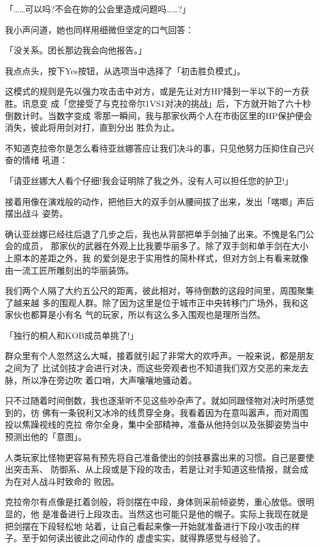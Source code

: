 \documentclass[11pt]{book}
\begin{document}
「……可以吗?不会在妳的公会里造成问题吗……?」

我小声问道，她也同样用细微但坚定的口气回答：

「没关系。团长那边我会向他报告。」

我点点头，按下Yes按钮，从选项当中选择了「初击胜负模式」。

这模式的规则是先以强力攻击击中对方，或是先让对方HP降到一半以下的一方获胜。讯息变
成「您接受了与克拉帝尔1VS1对决的挑战」后，下方就开始了六十秒倒数计时。当数字变成
零那一瞬间，我与那家伙两个人在市街区里的HP保护便会消失，彼此将用剑对打，直到分出
胜负为止。

不知道克拉帝尔是怎么看待亚丝娜答应让我们决斗的事，只见他努力压抑住自己兴奋的情绪
吼道：

「请亚丝娜大人看个仔细!我会证明除了我之外，没有人可以担任您的护卫!」

接着用像在演戏般的动作，把他巨大的双手剑从腰间拔了出来，发出「喀啷」声后摆出战斗
姿势。

确认亚丝娜已经往后退了几步之后，我也从背部把单手剑抽了出来。不愧是名门公会的成员，
那家伙的武器在外观上比我要华丽多了。除了双手剑和单手剑在大小上原本的差距之外，我
的爱剑是忠于实用性的简朴样式，但对方剑上有看来就像由一流工匠所雕刻出的华丽装饰。

我们两个人隔了大约五公尺的距离，彼此相对，等待倒数的这段时间里，周围聚集了越来越
多的围观人群。除了因为这里是位于城市正中央转移门广场外，我和这家伙也都算是小有名
气的玩家，所以有这么多入围观也是理所当然。

「独行的桐人和KOB成员单挑了!」

群众里有个人忽然这么大喊，接着就引起了非常大的欢呼声。一般来说，都是朋友之间为了
比试剑技才会进行对决，而这些旁观者也不知道我们双方交恶的来龙去脉，所以净在旁边吹
着口哨，大声嚷嚷地骚动着。

只不过随着时间倒数，我也逐渐听不见这些吵杂声了。就如同跟怪物对决时所感觉到的，彷
佛有一条锐利又冰冷的线贯穿全身。我看着因为在意叫嚣声，而对周围投以焦躁视线的克拉
帝尔全身，集中全部精神，准备从他持剑以及张脚姿势当中预测出他的「意图」。

人类玩家比怪物更容易有预先将自己准备使出的剑技暴露出来的习惯。自己是要使出突击系、
防御系、从上段或是下段的攻击，若是让对手知道这些情报，就会成为在对人战斗时致命的
败因。

克拉帝尔有点像是扛着剑般，将剑摆在中段，身体则采前倾姿势，重心放低。很明显的，他
是准备进行上段攻击。当然这也可能只是他的幌子。实际上我现在就是把剑摆在下段轻松地
站着，让自己看起来像一开始就准备进行下段小攻击的样子。至于如何读出彼此之间动作的
虚虚实实，就得靠感觉与经验了。
\end{document}
